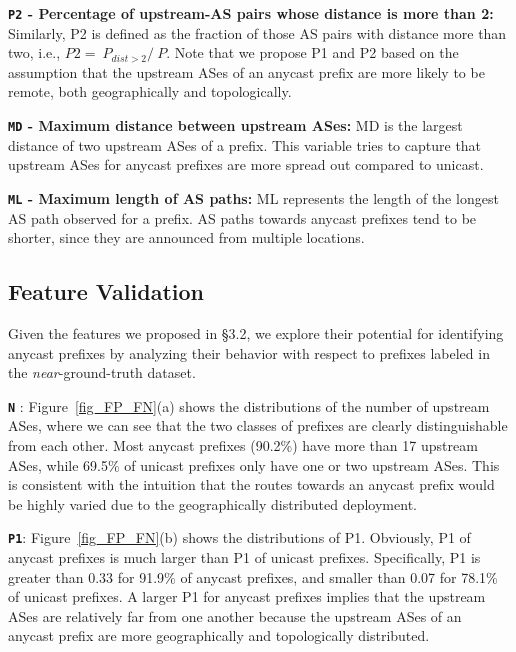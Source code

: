 \textbf{\texttt{P2} - Percentage of upstream-AS pairs whose distance is more than 2:} Similarly, P2 is defined as the fraction of those AS pairs with distance more than two, i.e., $P2=\ P_{dist>2}/ \ P$. Note that we propose P1 and P2 based on the assumption that the upstream ASes of an anycast prefix are more likely to be remote, both geographically and topologically.

\textbf{\texttt{MD} - Maximum distance between upstream ASes:} MD is the largest distance of two upstream ASes of a prefix. This variable tries to capture that upstream ASes for anycast prefixes are more spread out compared to unicast.

\textbf{\texttt{ML} - Maximum length of AS paths:} ML represents the length of
the longest AS path observed for a prefix. AS paths towards anycast prefixes
tend to be shorter, since they are announced from multiple locations. 

\subsection{Feature Validation}
\label{feature}

Given the features we proposed in \S3.2, we explore their potential for identifying anycast prefixes by analyzing their behavior with respect to prefixes labeled in the {\it near}-ground-truth dataset.  

\vspace{2pt}
\textbf{\texttt{N} }: Figure~\ref{fig_FP_FN}(a) shows the distributions of the number of upstream ASes, where we can see that the two classes of prefixes are clearly distinguishable from each other. Most anycast prefixes (90.2\%) have more than 17 upstream ASes, while 69.5\% of unicast prefixes only have one or two upstream ASes. This is consistent with the intuition that the routes towards an anycast prefix would be highly varied due to the geographically distributed deployment. 

\vspace{2pt}
\textbf{\texttt{P1}}: 
Figure~\ref{fig_FP_FN}(b) shows the distributions of P1. Obviously, P1 of
anycast prefixes is much larger than P1 of unicast prefixes. Specifically, P1 is
greater than 0.33 for 91.9\% of anycast prefixes,  and smaller than 0.07 for 78.1\% of unicast prefixes. A larger P1 for anycast prefixes implies that the upstream ASes are relatively far from one another because the upstream ASes of an anycast prefix are more geographically and topologically distributed. %

